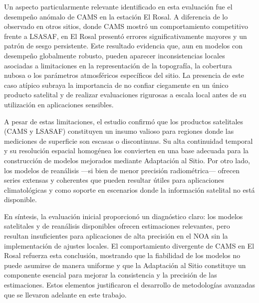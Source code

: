 \documentclass[letterpaper,12pt, twoside]{report}
\providecommand{\DIFdeltex}[1]{{\protect\color{red} \scriptsize #1}} %
\providecommand{\DIFdel}[1]{\texorpdfstring{\DIFdeltex{#1}}{}} %
\begin{document}
\DIFdel{Un aspecto particularmente relevante identificado en esta evaluación fue el desempeño anómalo de CAMS en la estación El Rosal. A diferencia de lo observado en otros sitios, donde CAMS mostró un comportamiento competitivo frente a LSASAF, en El Rosal presentó errores significativamente mayores y un patrón de sesgo persistente. Este resultado evidencia que, aun en modelos con desempeño globalmente robusto, pueden aparecer inconsistencias locales asociadas a limitaciones en la representación de la topografía, la cobertura nubosa o los parámetros atmosféricos específicos del sitio. La presencia de este caso atípico subraya la importancia de no confiar ciegamente en un único producto satelital y de realizar evaluaciones rigurosas a escala local antes de su utilización en aplicaciones sensibles.
}%

\DIFdel{A pesar de estas limitaciones, el estudio confirmó que los productos satelitales (CAMS y LSASAF) constituyen un insumo valioso para regiones donde las mediciones de superficie son escasas o discontinuas. Su alta continuidad temporal y su resolución espacial homogénea los convierten en una base adecuada para la construcción de modelos mejorados mediante Adaptación al Sitio. Por otro lado, los modelos de reanálisis —si bien de menor precisión radiométrica— ofrecen series extensas y coherentes que pueden resultar útiles para aplicaciones climatológicas y como soporte en escenarios donde la información satelital no está disponible.
}%

\DIFdel{En síntesis, la evaluación inicial proporcionó un diagnóstico claro: los modelos satelitales y de reanálisis disponibles ofrecen estimaciones relevantes, pero resultan insuficientes para aplicaciones de alta precisión en el NOA sin la implementación de ajustes locales. El comportamiento divergente de CAMS en El Rosal refuerza esta conclusión, mostrando que la fiabilidad de los modelos no puede asumirse de manera uniforme y que la Adaptación al Sitio constituye un componente esencial para mejorar la consistencia y la precisión de las estimaciones. Estos elementos justificaron el desarrollo de metodologías avanzadas que se llevaron adelante en este trabajo.
}%

\end{document}
